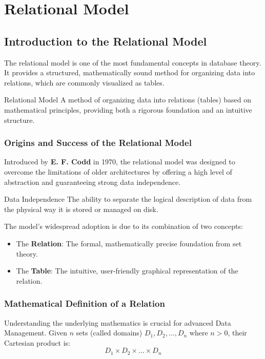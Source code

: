 

\section{Relational Model}

\subsection{Introduction to the Relational Model}
The relational model is one of the most fundamental concepts in database theory. It provides a structured, mathematically sound method for organizing data into relations, which are commonly visualized as tables.

\begin{defbox}{Relational Model}
A method of organizing data into relations (tables) based on mathematical principles, providing both a rigorous foundation and an intuitive structure.
\end{defbox}

\subsubsection{Origins and Success of the Relational Model}
Introduced by \textbf{E. F. Codd} in 1970, the relational model was designed to overcome the limitations of older architectures by offering a high level of abstraction and guaranteeing strong data independence.

\begin{defbox}{Data Independence}
The ability to separate the logical description of data from the physical way it is stored or managed on disk.
\end{defbox}



The model's widespread adoption is due to its combination of two concepts:
\begin{itemize}
    \item The \textbf{Relation}: The formal, mathematically precise foundation from set theory.
    \item The \textbf{Table}: The intuitive, user-friendly graphical representation of the relation.
\end{itemize}

\subsubsection{Mathematical Definition of a Relation}
Understanding the underlying mathematics is crucial for advanced Data Management. Given $n$ sets (called domains) $D_1, D_2, \dots, D_n$ where $n > 0$, their Cartesian product is:
$$D_1 \times D_2 \times \dots \times D_n$$


